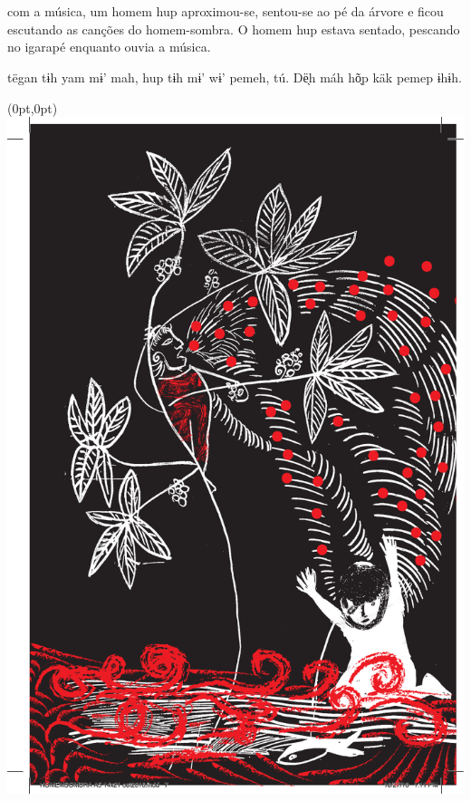 \chapter*{}

\mbox{}\vspace*{\fill}

 com a música,
um homem hup aproximou-se,
sentou-se ao pé da
árvore e ficou escutando as
canções do homem-sombra. O
homem hup estava sentado,
pescando no igarapé
enquanto ouvia a música.

\vspace{2em}

 tëgan tɨh yam mɨ’ mah,
hup tɨh mɨ’ wɨ’ pemeh, tú.
Dë̖h máh hõ̖p käk pemep ɨhɨh.

\vspace*{\fill}

\pagebreak

\begin{textblock*}{8in}(0pt,0pt)%
\vspace*{-2.8cm}
\hspace*{-3.2cm}\includegraphics[width=153mm]{./imgs/img2.pdf}
\end{textblock*}

